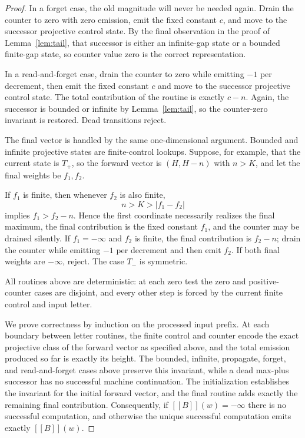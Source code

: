 \documentclass[11pt]{article}
\newcommand{\minf}{-\infty}
\newcommand{\eval}[1]{[\![#1]\!]}
\begin{document}
\begin{proof}
In a forget case, the old magnitude will never be needed again. Drain the counter to zero with zero emission, emit the fixed constant $c$, and move to the successor projective control state. By the final observation in the proof of Lemma~\ref{lem:tail}, that successor is either an infinite-gap state or a bounded finite-gap state, so counter value zero is the correct representation.

In a read-and-forget case, drain the counter to zero while emitting $-1$ per decrement, then emit the fixed constant $c$ and move to the successor projective control state. The total contribution of the routine is exactly $c-n$. Again, the successor is bounded or infinite by Lemma~\ref{lem:tail}, so the counter-zero invariant is restored. Dead transitions reject.

The final vector is handled by the same one-dimensional argument. Bounded and infinite projective states are finite-control lookups. Suppose, for example, that the current state is $T_+$, so the forward vector is $(H,H-n)$ with $n>K$, and let the final weights be $f_1,f_2$.

If $f_1$ is finite, then whenever $f_2$ is also finite,
\[
  n>K>|f_1-f_2|
\]
implies $f_1>f_2-n$. Hence the first coordinate necessarily realizes the final maximum, the final contribution is the fixed constant $f_1$, and the counter may be drained silently. If $f_1=\minf$ and $f_2$ is finite, the final contribution is $f_2-n$; drain the counter while emitting $-1$ per decrement and then emit $f_2$. If both final weights are $\minf$, reject. The case $T_-$ is symmetric.

All routines above are deterministic: at each zero test the zero and positive-counter cases are disjoint, and every other step is forced by the current finite control and input letter.

We prove correctness by induction on the processed input prefix. At each boundary between letter routines, the finite control and counter encode the exact projective class of the forward vector as specified above, and the total emission produced so far is exactly its height. The bounded, infinite, propagate, forget, and read-and-forget cases above preserve this invariant, while a dead max-plus successor has no successful machine continuation. The initialization establishes the invariant for the initial forward vector, and the final routine adds exactly the remaining final contribution. Consequently, if $\eval{B}(w)=\minf$ there is no successful computation, and otherwise the unique successful computation emits exactly $\eval{B}(w)$.
\end{proof}
\end{document}
